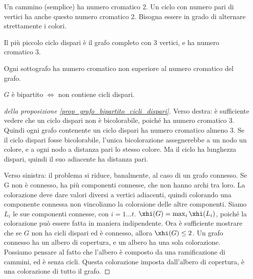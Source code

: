 	Un cammino (semplice) ha numero cromatico 2.
	Un ciclo con numero pari di vertici ha anche questo numero cromatico 2.
	Bisogna essere in grado di alternare strettamente i colori.

	Il pi\`u piccolo ciclo dispari \`e il grafo completo con 3 vertici, e ha numero cromatico 3.

	Ogni sottografo ha numero cromatico non superiore al numero cromatico del grafo.

	\begin{prop}
		\label{prop_grafo_bipartito_cicli_dispari}
		$G$ \`e bipartito $\iff$ non contiene cicli dispari.
	\end{prop}

	\begin{proof}[della proposizione \ref{prop_grafo_bipartito_cicli_dispari}]
		Verso destra: \`e sufficiente vedere che un ciclo dispari non \`e bicolorabile, poich\'e ha numero cromatico 3.
		Quindi ogni grafo contenente un ciclo dispari ha numero cromatico almeno 3.
		Se il ciclo dispari fosse bicolorabile, l'unica bicolorazione assegnerebbe a un nodo un colore, e a ogni nodo a distanza pari lo stesso colore.
		Ma il ciclo ha lunghezza dispari, quindi il suo adiacente ha distanza pari.

		Verso sinistra: il problema si riduce, banalmente, al caso di un grafo connesso.
		Se G non \`e connesso, ha pi\`u componenti connesse, che non hanno archi tra loro.
		La colorazione deve dare valori diversi a vertici adiacenti, quindi colorando una componente connessa non vincoliamo la coloraione delle altre componenti.
		Siamo $L_i$ le sue componenti connesse, con $i = 1 \dots t$.
		$\xhi(G) = \max_{i} \xhi(L_i)$, poich\'e la colorazione pu\`o essere fatta in maniera indipendente.
		Ora \`e sufficiente mostrare che se $G$ non ha cicli dispari ed \`e connesso, allora $\xhi(G) \le 2$.
		Un grafo connesso ha un albero di copertura, e un albero ha una sola colorazione.
		Possiamo pensare al fatto che l'albero \`e composto da una ramificazione di cammini, ed \`e senza cicli.
		Questa colorazione imposta dall'albero di copertura, \`e una colorazione di tutto il grafo.


\end{proof}
